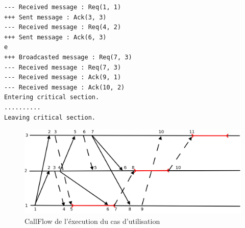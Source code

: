         \begin{minipage}{0.90\textwidth}
                \begin{lstlisting}
--- Received message : Req(1, 1)
+++ Sent message : Ack(3, 3)
--- Received message : Req(4, 2)
+++ Sent message : Ack(6, 3)
e
+++ Broadcasted message : Req(7, 3)
--- Received message : Req(7, 3)
--- Received message : Ack(9, 1)
--- Received message : Ack(10, 2)
Entering critical section.
..........
Leaving critical section.

\end{lstlisting}
        \end{minipage}
\begin{center}
\begin{figure}[H]
	\includegraphics[width=\textwidth]{images/casUtil.png}
\caption{CallFlow de l'éxecution du cas d'utilisation}
\end{figure}
\end{center}